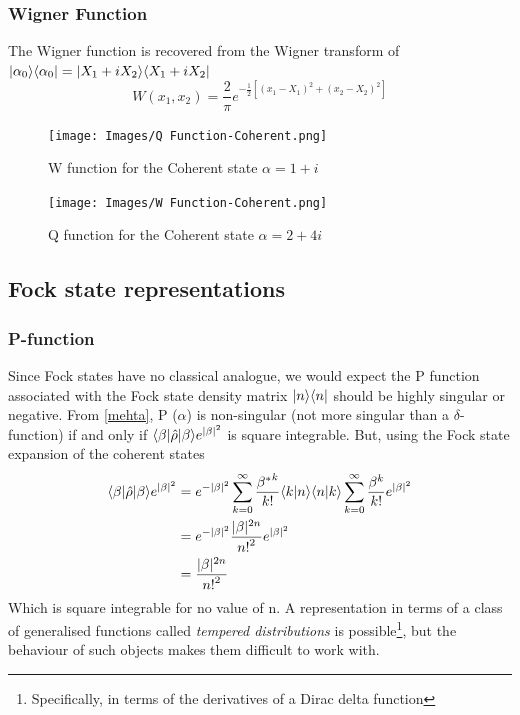 \subsubsection{Wigner Function}
The Wigner function is recovered from the Wigner transform of $| \alpha_0 \rangle\langle\alpha_0 | = | X_1+iX_2 \rangle\langle X_1+iX_2 |$
\begin{equation}
	W(x_1, x_2) = \frac{2}{ \pi} e^{-\frac{1}{2}[{(x_1-X_1)}^2+{(x_2-X_2)}^2]}
\end{equation}
\begin{figure}[h]
	\begin{minipage}[b]{.5\linewidth}
		\centering \large \texttt{[image: Images/Q Function-Coherent.png]}
		\caption{W function for the Coherent state $\alpha=1+i$}\label{fig:Qcoh}
	\end{minipage}%
	\begin{minipage}[b]{.5\linewidth}
		\centering\large \texttt{[image: Images/W Function-Coherent.png]}
		\caption{Q function for the Coherent state $\alpha=2+4i$}\label{fig:Wcoh}
	\end{minipage}
\end{figure}
\subsection{Fock state representations}
\subsubsection{P-function}
Since Fock states have no classical analogue, we would expect the P function associated with the Fock state density matrix $| n \rangle\langle n |$ should be highly singular or negative. From \cref{mehta}, P ($\alpha$) is non-singular (not more singular than a $\delta$-function) if and only if $ \langle\beta | \hat{\rho} | \beta \rangle e^{|\beta|^2} $ is square integrable. But, using the Fock state expansion of the coherent states
\begin{align}
	 \langle\beta | \hat{\rho} | \beta \rangle e^{|\beta|^2}  &= e^{-|\beta|^2} \sum_{k=0}^\infty \frac {{\beta^*}^k}{k!} \langle k | n \rangle\langle n | k \rangle \sum_{k=0}^\infty \frac {\beta^k}{k!}e^{|\beta|^2} \\ &= e^{-|\beta|^2} \frac{|\beta|^{2n}}{{n!}^2} e^{|\beta|^2} \\ &= \frac{|\beta|^{2n}}{{n!}^2}
\end{align}
Which is square integrable for no value of n.
A representation in terms of a class of generalised functions called \emph{tempered distributions} is possible\footnote{Specifically, in terms of the derivatives of a Dirac delta function\cite{Gerry2005}}, but the behaviour of such objects makes them difficult to work with.
